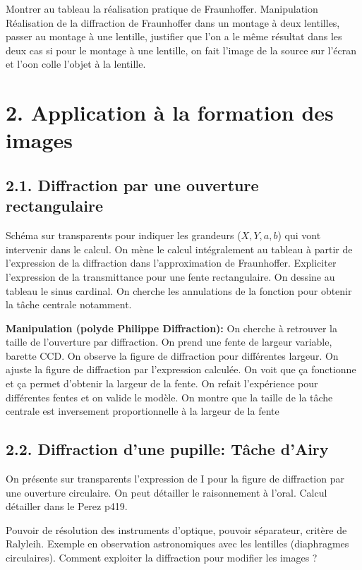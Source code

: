 \documentclass[french, a4paper, 10pt, twocolumn, landscape]{article}
\begin{document}
Montrer au tableau la réalisation pratique de Fraunhoffer. Manipulation Réalisation de la diffraction de Fraunhoffer dans un montage à deux lentilles, passer au montage à une lentille, justifier que l'on a le même résultat dans les deux cas si pour le montage à une lentille, on fait l'image de la source sur l'écran et l'oon colle l'objet à la lentille.

\section*{2. Application à la formation des images}

\subsection*{2.1. Diffraction par une ouverture rectangulaire}

Schéma sur transparents pour indiquer les grandeurs ($X,Y, a,b$) qui vont intervenir dans le calcul. On mène le calcul intégralement au tableau à partir de l'expression de la diffraction dans l'approximation de Fraunhoffer. Expliciter l'expression de la transmittance pour une fente rectangulaire. On dessine au tableau le sinus cardinal. On cherche les annulations de la fonction pour obtenir la tâche centrale notamment. 

\textbf{Manipulation (polyde Philippe Diffraction):} On cherche à retrouver la taille de l'ouverture par diffraction. On prend une fente de largeur variable, barette CCD. On observe la figure de diffraction pour différentes largeur. On ajuste la figure de diffraction par l'expression calculée. On voit que ça fonctionne et ça permet d'obtenir la largeur de la fente. On refait l'expérience pour différentes fentes et on valide le modèle. On montre que la taille de la tâche centrale est inversement proportionnelle à la largeur de la fente

\subsection*{2.2. Diffraction d'une pupille: Tâche d'Airy}
On présente sur transparents l'expression de I pour la figure de diffraction par une ouverture circulaire. On peut détailler le raisonnement à l'oral. Calcul détailler dans le Perez p419. 

Pouvoir de résolution des instruments d'optique, pouvoir séparateur, critère de Ralyleih. Exemple en observation astronomiques avec les lentilles (diaphragmes circulaires).
Comment exploiter la diffraction pour modifier les images ? 
\end{document}
